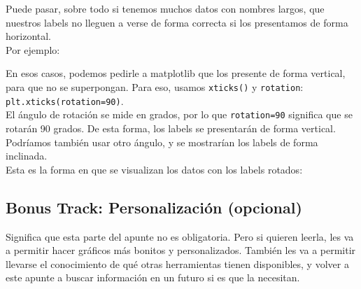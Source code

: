 \documentclass[
  letterpaper,
  DIV=11,
  numbers=noendperiod]{scrreprt}
\begin{document}
\begin{tcolorbox}[enhanced jigsaw, arc=.35mm, toptitle=1mm, colframe=quarto-callout-note-color-frame, bottomtitle=1mm, opacitybacktitle=0.6, colbacktitle=quarto-callout-note-color!10!white, leftrule=.75mm, coltitle=black, toprule=.15mm, titlerule=0mm, title=\textcolor{quarto-callout-note-color}{\faInfo}\hspace{0.5em}{¿Qué pasa si nuestros labels no llegan a verse? (opcional)}, bottomrule=.15mm, rightrule=.15mm, colback=white, breakable, opacityback=0, left=2mm]

Puede pasar, sobre todo si tenemos muchos datos con nombres largos, que
nuestros labels no lleguen a verse de forma correcta si los presentamos
de forma horizontal.\\
Por ejemplo:

En esos casos, podemos pedirle a matplotlib que los presente de forma
vertical, para que no se superpongan. Para eso, usamos \texttt{xticks()}
y \texttt{rotation}: \texttt{plt.xticks(rotation=90)}.\\
El ángulo de rotación se mide en grados, por lo que \texttt{rotation=90}
significa que se rotarán 90 grados. De esta forma, los labels se
presentarán de forma vertical. Podríamos también usar otro ángulo, y se
mostrarían los labels de forma inclinada.\\
Esta es la forma en que se visualizan los datos con los labels rotados:

\end{tcolorbox}

\subsection{Bonus Track: Personalización
(opcional)}\label{bonus-track-personalizaciuxf3n-opcional}

\begin{tcolorbox}[enhanced jigsaw, arc=.35mm, toptitle=1mm, colframe=quarto-callout-note-color-frame, bottomtitle=1mm, opacitybacktitle=0.6, colbacktitle=quarto-callout-note-color!10!white, leftrule=.75mm, coltitle=black, toprule=.15mm, titlerule=0mm, title=\textcolor{quarto-callout-note-color}{\faInfo}\hspace{0.5em}{¿Qué significa opcional?}, bottomrule=.15mm, rightrule=.15mm, colback=white, breakable, opacityback=0, left=2mm]

Significa que esta parte del apunte no es obligatoria. Pero si quieren
leerla, les va a permitir hacer gráficos más bonitos y personalizados.
También les va a permitir llevarse el conocimiento de qué otras
herramientas tienen disponibles, y volver a este apunte a buscar
información en un futuro si es que la necesitan.

\end{tcolorbox}
\end{document}

